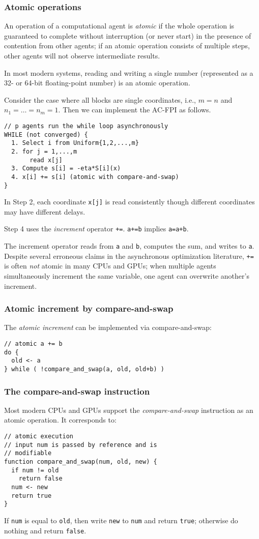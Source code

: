 \documentclass[10pt,mathserif]{beamer}
\begin{document}
\begin{frame}
\frametitle{Atomic operations}
An operation of a computational agent is \emph{atomic} if the whole operation is guaranteed to complete without interruption (or never start) in the presence of contention from other agents; if an atomic operation consists of multiple steps, other agents will not observe intermediate results. 
\medskip

In most modern systems, reading and writing a single number (represented as a 32- or 64-bit floating-point number) is an atomic operation.
\end{frame}


\begin{frame}[fragile]

Consider the case where all blocks are single coordinates, i.e., $m=n$ and $n_1=\dots= n_m=1$.
Then we can implement the AC-FPI as follows.
\begin{lstlisting}
// p agents run the while loop asynchronously
WHILE (not converged) {
  1. Select i from Uniform{1,2,...,m}
  2. for j = 1,...,m
       read x[j]
  3. Compute s[i] = -eta*S[i](x)
  4. x[i] += s[i] (atomic with compare-and-swap)
}
\end{lstlisting}
In Step 2, each coordinate \verb|x[j]| is read consistently though different coordinates may have different delays.
\smallskip

Step 4 uses the \emph{increment} operator \verb|+=|.  \verb|a+=b| implies \verb|a=a+b|.
\smallskip

The increment operator reads from \verb|a| and \verb|b|, computes the sum, and writes to \verb|a|.
Despite several erroneous claims in the asynchronous optimization literature, \verb|+=| is often \emph{not} atomic in many CPUs and GPUs;
when multiple agents simultaneously increment the same variable, one agent can overwrite another's increment.
\end{frame}


\begin{frame}[fragile]
\frametitle{Atomic increment by compare-and-swap}
The \emph{atomic increment} can be implemented via compare-and-swap:
\begin{lstlisting}
// atomic a += b
do {
  old <- a
} while ( !compare_and_swap(a, old, old+b) )
\end{lstlisting}
\end{frame}


\begin{frame}[fragile]
\frametitle{The compare-and-swap instruction}

Most modern CPUs and GPUs support the \emph{compare-and-swap} instruction as an atomic operation. It corresponds to:
\begin{lstlisting}
// atomic execution
// input num is passed by reference and is
// modifiable
function compare_and_swap(num, old, new) {
  if num != old
    return false
  num <- new
  return true
}
\end{lstlisting}
\medskip

If \verb|num| is equal to \verb|old|, then write \verb|new| to \verb|num| and return \verb|true|; otherwise do nothing and return \verb|false|.
\end{frame}
\end{document}

